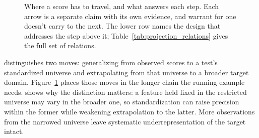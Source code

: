 \documentclass[12pt]{article}
\begin{document}
\begin{figure}[tbp]
\centering
\footnotesize
{}
\caption{Where a score has to travel, and what answers each step. Each arrow is a separate claim with its own evidence, and warrant for one doesn't carry to the next. The lower row names the design that addresses the step above it; Table~\ref{tab:projection_relations} gives the full set of relations.}\label{fig:where_scores_travel}
\end{figure}

\Textcite[22--25]{kane2013validating} distinguishes two moves: generalizing from observed scores to a test's standardized universe and extrapolating from that universe to a broader target domain. Figure~\ref{fig:where_scores_travel} places those moves in the longer chain the running example needs. \Textcite[132--135]{brennan2001generalizability} shows why the distinction matters: a feature held fixed in the restricted universe may vary in the broader one, so standardization can raise precision within the former while weakening extrapolation to the latter. More observations from the narrowed universe leave systematic underrepresentation of the target intact.
\end{document}
